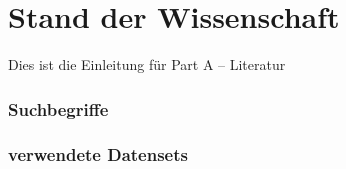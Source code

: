\chapter{Stand der Wissenschaft}
Dies ist die Einleitung für Part A -- Literatur

\subsection{Suchbegriffe}



\subsection{verwendete Datensets}


